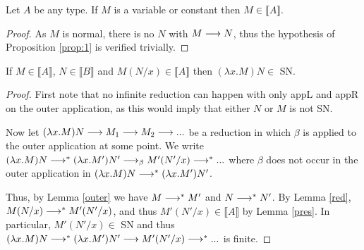 \documentclass[]{StandardTemplate}
\begin{document}
 \begin{cor}
   \label{consvar}
   Let $ A $ be any type. If $ M $ is a variable or constant then $ M \in \llbracket A \rrbracket $.
 \end{cor}
 \begin{proof}
   As $ M $ is normal, there is no $ N $ with $ M \longrightarrow N $, thus the hypothesis of Proposition \ref{prop:1} is verified trivially.
 \end{proof}

\begin{lem}
If $ M \in \llbracket A \rrbracket $, $ N \in \llbracket B \rrbracket $ and $ M(N/x) \in \llbracket A \rrbracket $ then $ (\lambda x . M) N \in $ SN.
\end{lem}
\begin{proof}
  First note that no infinite reduction can happen with only appL and appR on the outer application, as this would imply that either $ N $ or $ M $ is not SN.

  Now let $ (\lambda x . M) N \longrightarrow M_1 \longrightarrow M_2 \longrightarrow ...$ be a reduction in which $ \beta $ is applied to the outer application at some point. We write $ (\lambda x . M) N \longrightarrow^* (\lambda x . M') N' \longrightarrow_\beta  M'(N'/x) \longrightarrow^*...$ where $ \beta $ does not occur in the outer application in $ (\lambda x . M) N \longrightarrow^* (\lambda x . M') N'$.

  Thus, by Lemma \ref{outer} we have $ M \longrightarrow^* M' $ and $ N \longrightarrow^* N' $. By Lemma \ref{red}, $ M(N/x) \longrightarrow^* M'(N'/x)$, and thus $ M'(N'/x) \in \llbracket A \rrbracket$ by Lemma \ref{pres}. In particular, $ M'(N'/x) \in  $ SN and thus $ (\lambda x . M) N \longrightarrow^* (\lambda x . M') N' \longrightarrow M' (N'/x) \longrightarrow^*  ...$ is finite.
\end{proof}
\end{document}
